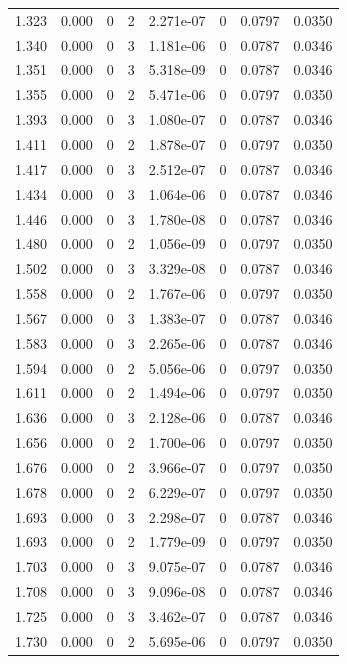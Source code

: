 \documentclass[preview]{standalone}
\begin{document}
{{{\begin{tabular}{L{1.2cm}C{1.2cm} C{0.3cm}C{0.5cm} C{1.4cm}C{1.4cm} C{1.4cm}C{1.4cm}}
  1.323  &  0.000  & 0     &  2 &  2.271e-07  & 0  & 0.0797 &  0.0350   \\ 
  1.340  &  0.000  & 0     &  3 &  1.181e-06  & 0  & 0.0787 &  0.0346   \\ 
  1.351  &  0.000  & 0     &  3 &  5.318e-09  & 0  & 0.0787 &  0.0346   \\ 
  1.355  &  0.000  & 0     &  2 &  5.471e-06  & 0  & 0.0797 &  0.0350   \\ 
  1.393  &  0.000  & 0     &  3 &  1.080e-07  & 0  & 0.0787 &  0.0346   \\ 
  1.411  &  0.000  & 0     &  2 &  1.878e-07  & 0  & 0.0797 &  0.0350   \\ 
  1.417  &  0.000  & 0     &  3 &  2.512e-07  & 0  & 0.0787 &  0.0346   \\ 
  1.434  &  0.000  & 0     &  3 &  1.064e-06  & 0  & 0.0787 &  0.0346   \\ 
  1.446  &  0.000  & 0     &  3 &  1.780e-08  & 0  & 0.0787 &  0.0346   \\ 
  1.480  &  0.000  & 0     &  2 &  1.056e-09  & 0  & 0.0797 &  0.0350   \\ 
  1.502  &  0.000  & 0     &  3 &  3.329e-08  & 0  & 0.0787 &  0.0346   \\ 
  1.558  &  0.000  & 0     &  2 &  1.767e-06  & 0  & 0.0797 &  0.0350   \\ 
  1.567  &  0.000  & 0     &  3 &  1.383e-07  & 0  & 0.0787 &  0.0346   \\ 
  1.583  &  0.000  & 0     &  3 &  2.265e-06  & 0  & 0.0787 &  0.0346   \\ 
  1.594  &  0.000  & 0     &  2 &  5.056e-06  & 0  & 0.0797 &  0.0350   \\ 
  1.611  &  0.000  & 0     &  2 &  1.494e-06  & 0  & 0.0797 &  0.0350   \\ 
  1.636  &  0.000  & 0     &  3 &  2.128e-06  & 0  & 0.0787 &  0.0346   \\ 
  1.656  &  0.000  & 0     &  2 &  1.700e-06  & 0  & 0.0797 &  0.0350   \\ 
  1.676  &  0.000  & 0     &  2 &  3.966e-07  & 0  & 0.0797 &  0.0350   \\ 
  1.678  &  0.000  & 0     &  2 &  6.229e-07  & 0  & 0.0797 &  0.0350   \\ 
  1.693  &  0.000  & 0     &  3 &  2.298e-07  & 0  & 0.0787 &  0.0346   \\ 
  1.693  &  0.000  & 0     &  2 &  1.779e-09  & 0  & 0.0797 &  0.0350   \\ 
  1.703  &  0.000  & 0     &  3 &  9.075e-07  & 0  & 0.0787 &  0.0346   \\ 
  1.708  &  0.000  & 0     &  3 &  9.096e-08  & 0  & 0.0787 &  0.0346   \\ 
  1.725  &  0.000  & 0     &  3 &  3.462e-07  & 0  & 0.0787 &  0.0346   \\ 
  1.730  &  0.000  & 0     &  2 &  5.695e-06  & 0  & 0.0797 &  0.0350   \\ 
\hline 
\end{tabular} 

}}}
\end{document}
